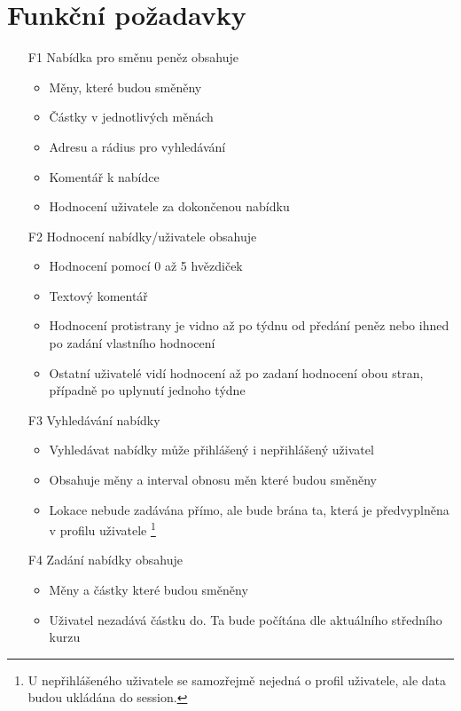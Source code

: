 \section{Funkční požadavky}
\begin{itemize}
    \item[F1] Nabídka pro směnu peněz obsahuje
        \begin{itemize}
            \item Měny, které budou směněny
            \item Částky v jednotlivých měnách
            \item Adresu a rádius pro vyhledávání
            \item Komentář k nabídce
            \item Hodnocení uživatele za dokončenou nabídku
        \end{itemize}
    \item[F2] Hodnocení nabídky/uživatele obsahuje
        \begin{itemize}
            \item Hodnocení pomocí 0 až 5 hvězdiček
            \item Textový komentář
            \item Hodnocení protistrany je vidno až po týdnu od předání peněz nebo ihned po zadání vlastního hodnocení
            \item Ostatní uživatelé vidí hodnocení až po zadaní hodnocení obou stran, případně po uplynutí jednoho týdne
        \end{itemize}
    \item[F3] Vyhledávání nabídky
        \begin{itemize}
            \item Vyhledávat nabídky může přihlášený i nepřihlášený uživatel
            \item Obsahuje měny a interval obnosu měn které budou směněny
            \item Lokace nebude zadávána přímo, ale bude brána ta, která je předvyplněna v profilu uživatele \footnote{U nepřihlášeného uživatele se samozřejmě nejedná o profil uživatele, ale data budou ukládána do session.}
        \end{itemize}
    \item[F4] Zadání nabídky obsahuje
        \begin{itemize}
            \item Měny a částky které budou směněny
            \item Uživatel nezadává částku do. Ta bude počítána dle aktuálního středního kurzu

\end{itemize}
\end{itemize}
